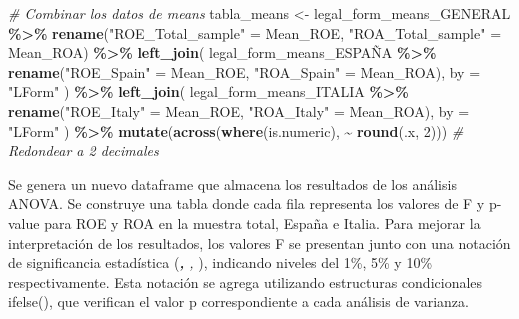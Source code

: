 \documentclass[
]{article}
\newenvironment{Shaded}{\begin{snugshade}}{\end{snugshade}}
\newcommand{\AttributeTok}[1]{\textcolor[rgb]{0.13,0.29,0.53}{#1}}
\newcommand{\CommentTok}[1]{\textcolor[rgb]{0.56,0.35,0.01}{\textit{#1}}}
\newcommand{\DecValTok}[1]{\textcolor[rgb]{0.00,0.00,0.81}{#1}}
\newcommand{\FunctionTok}[1]{\textcolor[rgb]{0.13,0.29,0.53}{\textbf{#1}}}
\newcommand{\NormalTok}[1]{#1}
\newcommand{\OtherTok}[1]{\textcolor[rgb]{0.56,0.35,0.01}{#1}}
\newcommand{\SpecialCharTok}[1]{\textcolor[rgb]{0.81,0.36,0.00}{\textbf{#1}}}
\newcommand{\StringTok}[1]{\textcolor[rgb]{0.31,0.60,0.02}{#1}}
\begin{document}
\begin{Shaded}
\begin{Highlighting}[]
\CommentTok{\# Combinar los datos de means }
\NormalTok{tabla\_means }\OtherTok{\textless{}{-}}\NormalTok{ legal\_form\_means\_GENERAL }\SpecialCharTok{\%\textgreater{}\%}
  \FunctionTok{rename}\NormalTok{(}\StringTok{"ROE\_Total\_sample"} \OtherTok{=}\NormalTok{ Mean\_ROE, }\StringTok{"ROA\_Total\_sample"} \OtherTok{=}\NormalTok{ Mean\_ROA) }\SpecialCharTok{\%\textgreater{}\%}
  \FunctionTok{left\_join}\NormalTok{(}
\NormalTok{    legal\_form\_means\_ESPAÑA }\SpecialCharTok{\%\textgreater{}\%}
      \FunctionTok{rename}\NormalTok{(}\StringTok{"ROE\_Spain"} \OtherTok{=}\NormalTok{ Mean\_ROE, }\StringTok{"ROA\_Spain"} \OtherTok{=}\NormalTok{ Mean\_ROA),}
    \AttributeTok{by =} \StringTok{"LForm"}
\NormalTok{  ) }\SpecialCharTok{\%\textgreater{}\%}
  \FunctionTok{left\_join}\NormalTok{(}
\NormalTok{    legal\_form\_means\_ITALIA }\SpecialCharTok{\%\textgreater{}\%}
      \FunctionTok{rename}\NormalTok{(}\StringTok{"ROE\_Italy"} \OtherTok{=}\NormalTok{ Mean\_ROE, }\StringTok{"ROA\_Italy"} \OtherTok{=}\NormalTok{ Mean\_ROA),}
    \AttributeTok{by =} \StringTok{"LForm"}
\NormalTok{  ) }\SpecialCharTok{\%\textgreater{}\%}
  \FunctionTok{mutate}\NormalTok{(}\FunctionTok{across}\NormalTok{(}\FunctionTok{where}\NormalTok{(is.numeric), }\SpecialCharTok{\textasciitilde{}} \FunctionTok{round}\NormalTok{(.x, }\DecValTok{2}\NormalTok{)))  }\CommentTok{\# Redondear a 2 decimales}
\end{Highlighting}
\end{Shaded}

Se genera un nuevo dataframe que almacena los resultados de los análisis
ANOVA. Se construye una tabla donde cada fila representa los valores de
F y p-value para ROE y ROA en la muestra total, España e Italia. Para
mejorar la interpretación de los resultados, los valores F se presentan
junto con una notación de significancia estadística (\emph{\textbf{, },
}), indicando niveles del 1\%, 5\% y 10\% respectivamente. Esta notación
se agrega utilizando estructuras condicionales ifelse(), que verifican
el valor p correspondiente a cada análisis de varianza.
\end{document}
